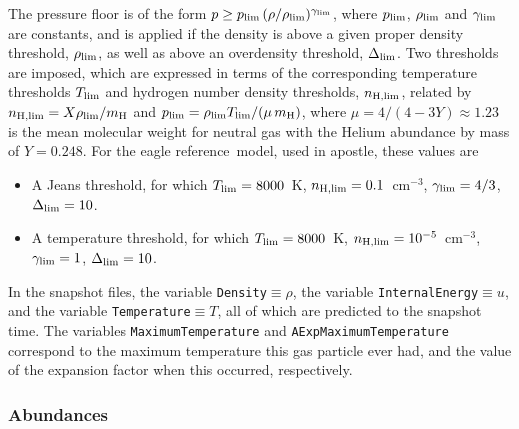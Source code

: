 \documentclass[10pt, a4paper]{article}
\newcommand{\apostle}{{\sc apostle}}
\newcommand{\REF}{{\sc eagle reference}}
\begin{document}
The pressure floor is of the form $p\ge p_{\rm lim}\,(\rho/\rho_{\rm lim})^{\gamma_{\rm lim}}$,  where $p_{\rm lim}$, $\rho_{\rm lim}$ and $\gamma_{\rm lim}$ are constants, and is applied if the density is above a given proper density threshold, $\rho_{\rm lim}$, as well as above an overdensity threshold, $\Delta_{\rm lim}$. Two thresholds are imposed, which are expressed in terms of the corresponding temperature thresholds $T_{\rm lim}$ and hydrogen number density thresholds, $n_{\rm H, lim}$, related by $n_{\rm H, lim}=X\rho_{\rm lim}/m_{\rm H}$ and $p_{\rm lim}=\rho_{\rm lim}T_{\rm lim}/(\mu\,m_{\rm H})$, where $\mu=4/(4-3Y)\approx 1.23$ is the mean molecular weight for neutral gas with the \cite{2014AnA...571A..16P} Helium abundance by mass of $Y=0.248$. For the \REF\ model, used in \apostle, these values are
\begin{itemize} 
\item A Jeans threshold, for which $T_{\rm lim}=8000$~K, $n_{\rm H, lim}=0.1$~cm$^{-3}$, $\gamma_{\rm lim}=4/3$, $\Delta_{\rm lim}=10$.
\item A temperature threshold, for which $T_{\rm lim}=8000$~K, $n_{\rm H, lim}=10^{-5}$~cm$^{-3}$, $\gamma_{\rm lim}=1$, $\Delta_{\rm lim}=10$.
\end{itemize}

In the snapshot files, the variable \texttt{Density}$\equiv \rho$, the variable \texttt{InternalEnergy}$\equiv u$, and the variable \texttt{Temperature}$\equiv T$, all of which are predicted to the snapshot time. The variables \texttt{MaximumTemperature} and \texttt{AExpMaximumTemperature} correspond to the maximum temperature this gas particle ever had, and the value of the expansion factor when this occurred, respectively. 

\subsubsection{Abundances}
\label{SecAbundances}
\end{document}
